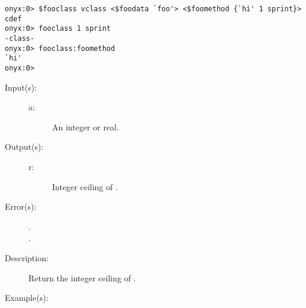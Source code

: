 \begin{description}
\begin{description}
\begin{verbatim}
onyx:0> $fooclass vclass <$foodata `foo'> <$foomethod {`hi' 1 sprint}> cdef
onyx:0> fooclass 1 sprint
-class-
onyx:0> fooclass:foomethod
`hi'
onyx:0>
		\end{verbatim}
	\end{description}
\label{systemdict:ceiling}
\item[{\onyxop{a}{ceiling}{r}}: ]
	\begin{description}\item[]
	\item[Input(s): ]
		\begin{description}\item[]
		\item[a: ]
			An integer or real.
		\end{description}
	\item[Output(s): ]
		\begin{description}\item[]
		\item[r: ]
			Integer ceiling of .
		\end{description}
	\item[Error(s): ]
		\begin{description}\item[]
		\item[.]
		\item[.]
		\end{description}
	\item[Description: ]
		Return the integer ceiling of .
	\item[Example(s): ]\begin{verbatim}


\end{verbatim}
\end{description}
\end{description}
